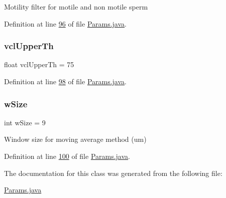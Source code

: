 Motility filter for motile and non motile sperm 

Definition at line \hyperlink{_params_8java_source_l00096}{96} of file \hyperlink{_params_8java_source}{Params.\+java}.

\hypertarget{classdata_1_1_params_ae0c29f446e3d569d730c8251a31e7ac2}{}\label{classdata_1_1_params_ae0c29f446e3d569d730c8251a31e7ac2} 
\subsubsection{\texorpdfstring{vcl\+Upper\+Th}{vclUpperTh}}
{\footnotesize\ttfamily float vcl\+Upper\+Th = 75\hspace{0.3cm}{\ttfamily [static]}}



Definition at line \hyperlink{_params_8java_source_l00098}{98} of file \hyperlink{_params_8java_source}{Params.\+java}.

\hypertarget{classdata_1_1_params_ad1b7844e5f66ee81c3de06d1a8ca645e}{}\label{classdata_1_1_params_ad1b7844e5f66ee81c3de06d1a8ca645e} 
\subsubsection{\texorpdfstring{w\+Size}{wSize}}
{\footnotesize\ttfamily int w\+Size = 9\hspace{0.3cm}{\ttfamily [static]}}

Window size for moving average method (um) 

Definition at line \hyperlink{_params_8java_source_l00100}{100} of file \hyperlink{_params_8java_source}{Params.\+java}.



The documentation for this class was generated from the following file\+:\begin{DoxyCompactItemize}
\item 
\hyperlink{_params_8java}{Params.\+java}\end{DoxyCompactItemize}
